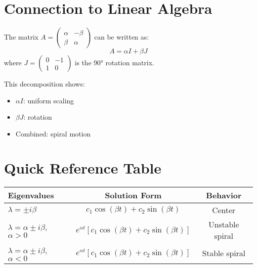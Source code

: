 \documentclass[12pt]{article}
\begin{document}
\section{Connection to Linear Algebra}

The matrix $A = \begin{pmatrix} \alpha & -\beta \\ \beta & \alpha \end{pmatrix}$ can be written as:
\[A = \alpha I + \beta J\]
where $J = \begin{pmatrix} 0 & -1 \\ 1 & 0 \end{pmatrix}$ is the 90° rotation matrix.

This decomposition shows:
\begin{itemize}
\item $\alpha I$: uniform scaling
\item $\beta J$: rotation
\item Combined: spiral motion
\end{itemize}

\section{Quick Reference Table}

\begin{center}
\begin{tabular}{|l|c|c|}
\hline
\textbf{Eigenvalues} & \textbf{Solution Form} & \textbf{Behavior} \\
\hline
$\lambda = \pm i\beta$ & $c_{1}\cos(\beta t) + c_{2}\sin(\beta t)$ & Center \\
$\lambda = \alpha \pm i\beta$, $\alpha > 0$ & $e^{\alpha t}[c_{1}\cos(\beta t) + c_{2}\sin(\beta t)]$ & Unstable spiral \\
$\lambda = \alpha \pm i\beta$, $\alpha < 0$ & $e^{\alpha t}[c_{1}\cos(\beta t) + c_{2}\sin(\beta t)]$ & Stable spiral \\
\hline
\end{tabular}
\end{center}
\end{document}
